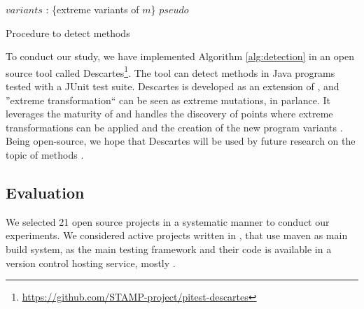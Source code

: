\begin{algorithm}[t]
	\begin{algorithmic}[1]
		\label{of-interest}
			\State $variants$ : \{extreme variants of $m$\}
			\label{if-return}
			\Else\label{no-return}
			\EndIf
		\EndFor
			\label{alg-porig}
			\label{is-pseudo}
			\EndIf
		\EndFor
		\Return $pseudo$
	\end{algorithmic}
	\caption{Procedure to detect \pseudotested{} methods}
	\label{alg:detection}
\end{algorithm}

To conduct our study, we have implemented Algorithm \ref{alg:detection} in an open source tool called Descartes\footnote{\url{https://github.com/STAMP-project/pitest-descartes}}. 
The tool can detect \pseudotested{} methods in Java programs tested with a JUnit test suite.
Descartes is developed as an extension of \pit{} \cite{coles_pit_2016}, and ''extreme transformation`` can be seen as extreme mutations, in \pit parlance.
It leverages the maturity of \pit{} and handles the discovery of points where extreme transformations can be applied and the creation of the new program variants \cite{veraperez2018descartes}.
Being open-source, we hope that Descartes  will be used by future research on the topic of \pseudotested{} methods .

\subsection{Evaluation}
\label{subsec:transversal-contributions:descartes:evaluation}

We selected 21 open source projects in a systematic manner to conduct our experiments. 
We considered active projects written in \java{}, that use maven as main build system, \junit{} as the main testing framework and their code is available in a version control hosting service, mostly \gh.


